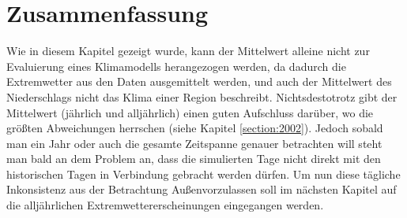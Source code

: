 \section{Zusammenfassung}
Wie in diesem Kapitel gezeigt wurde, kann der Mittelwert alleine nicht zur Evaluierung eines Klimamodells herangezogen werden, da dadurch die Extremwetter aus den Daten ausgemittelt werden, und auch der Mittelwert des Niederschlags nicht das Klima einer Region beschreibt. Nichtsdestotrotz gibt der Mittelwert (jährlich und alljährlich) einen guten Aufschluss darüber, wo die größten Abweichungen herrschen (siehe Kapitel \ref{section:2002}). Jedoch sobald man ein Jahr oder auch die gesamte Zeitspanne genauer betrachten will steht man bald an dem Problem an, dass die simulierten Tage nicht direkt mit den historischen Tagen in Verbindung gebracht werden dürfen. Um nun diese tägliche Inkonsistenz aus der Betrachtung Außenvorzulassen soll im nächsten Kapitel auf die alljährlichen Extremwettererscheinungen eingegangen werden.

